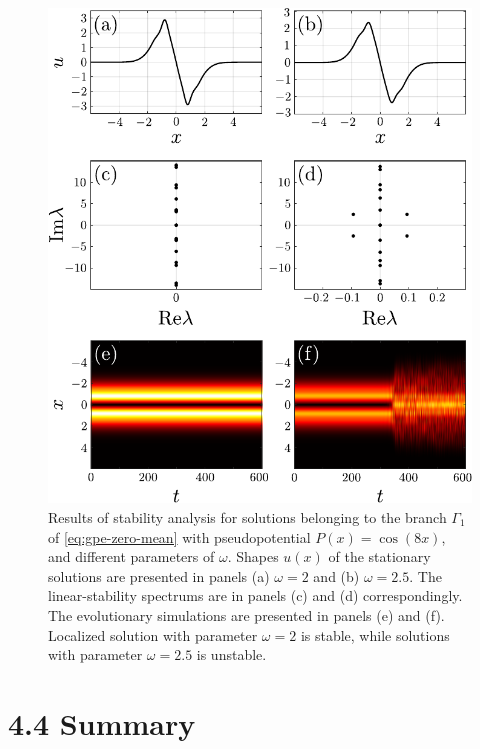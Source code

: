 \pagebreak
\begin{figure}[h]
\centering
	\includegraphics[scale = 1]{pic/stability, zero mean cosine nho}
	\caption{
		Results of stability analysis for solutions belonging to the branch $\Gamma_1$ of \eqref{eq:gpe-zero-mean} with pseudopotential $P(x) = \cos (8 x)$, and different parameters of $\omega$.
		Shapes $u(x)$ of the stationary solutions are presented in panels (a) $\omega = 2$ and (b) $\omega = 2.5$.
		The linear-stability spectrums are in panels (c) and (d) correspondingly.
		The evolutionary simulations are presented in panels (e) and (f).
		Localized solution with parameter $\omega = 2$ is stable, while solutions with parameter $\omega = 2.5$ is unstable.
	}
\label{fig:stability-nho-zero-mean}
\end{figure}
\pagebreak

\section*{4.4 Summary}

